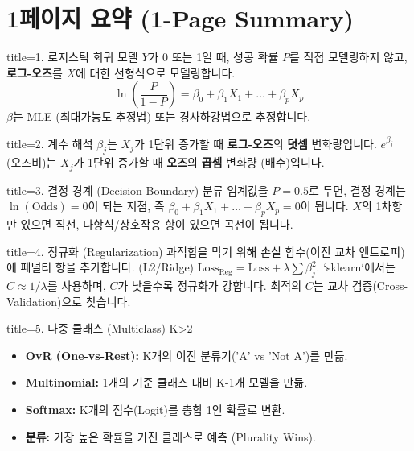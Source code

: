 \documentclass[11pt,a4paper]{book}
\theoremstyle{definition}
\begin{document}
\section{1페이지 요약 (1-Page Summary)}

\begin{tcolorbox}{title=1. 로지스틱 회귀 모델}
$Y$가 0 또는 1일 때, 성공 확률 $P$를 직접 모델링하지 않고, \textbf{로그-오즈}를 $X$에 대한 선형식으로 모델링합니다.
$$ \ln\left(\frac{P}{1-P}\right) = \beta_0 + \beta_1 X_1 + \dots + \beta_p X_p $$
$\beta$는 MLE (최대가능도 추정법) 또는 경사하강법으로 추정합니다.
\end{tcolorbox}

\begin{tcolorbox}{title=2. 계수 해석}
$\beta_j$는 $X_j$가 1단위 증가할 때 \textbf{로그-오즈}의 \textbf{덧셈} 변화량입니다.
$e^{\beta_j}$ (오즈비)는 $X_j$가 1단위 증가할 때 \textbf{오즈}의 \textbf{곱셈} 변화량 (배수)입니다.
\end{tcolorbox}

\begin{tcolorbox}{title=3. 결정 경계 (Decision Boundary)}
분류 임계값을 $P=0.5$로 두면, 결정 경계는 $\ln(\text{Odds})=0$이 되는 지점,
즉 $\beta_0 + \beta_1 X_1 + \dots + \beta_p X_p = 0$이 됩니다.
$X$의 1차항만 있으면 직선, 다항식/상호작용 항이 있으면 곡선이 됩니다.
\end{tcolorbox}

\begin{tcolorbox}{title=4. 정규화 (Regularization)}
과적합을 막기 위해 손실 함수(이진 교차 엔트로피)에 페널티 항을 추가합니다.
(L2/Ridge) $\text{Loss}_{\text{Reg}} = \text{Loss} + \lambda \sum \beta_j^2$.
`sklearn`에서는 $C \approx 1/\lambda$를 사용하며, $C$가 낮을수록 정규화가 강합니다.
최적의 $C$는 교차 검증(Cross-Validation)으로 찾습니다.
\end{tcolorbox}

\begin{tcolorbox}{title=5. 다중 클래스 (Multiclass) K>2}
\begin{itemize}
    \item \textbf{OvR (One-vs-Rest):} K개의 이진 분류기('A' vs 'Not A')를 만듦.
    \item \textbf{Multinomial:} 1개의 기준 클래스 대비 K-1개 모델을 만듦.
    \item \textbf{Softmax:} K개의 점수(Logit)를 총합 1인 확률로 변환.
    \item \textbf{분류:} 가장 높은 확률을 가진 클래스로 예측 (Plurality Wins).
\end{itemize}
\end{tcolorbox}
\end{document}
